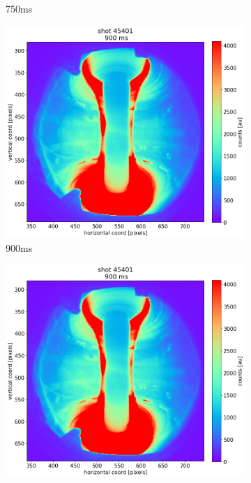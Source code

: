 \begin{figure}[!ht]
\begin{subfigure}{0.3\linewidth}
         \caption{750ms}
         \label{fig:mu01_tomo3b}
    \end{subfigure}
    \begin{subfigure}{0.3\linewidth}
         \centering
         \includegraphics[trim={60 0 120 60},clip,width=\textwidth]{Chapters/chapter2/figs/45401_for_paper_900ms.png}
         \caption{900ms}
         \label{fig:mu01_tomo3c}
    \end{subfigure}
    \begin{subfigure}{0.054\linewidth}
         \centering
         \vspace{-6mm}
         \includegraphics[trim={595 0 0 50},clip,width=\textwidth]{Chapters/chapter2/figs/45401_for_paper_900ms.png}

\end{subfigure}
\end{figure}

